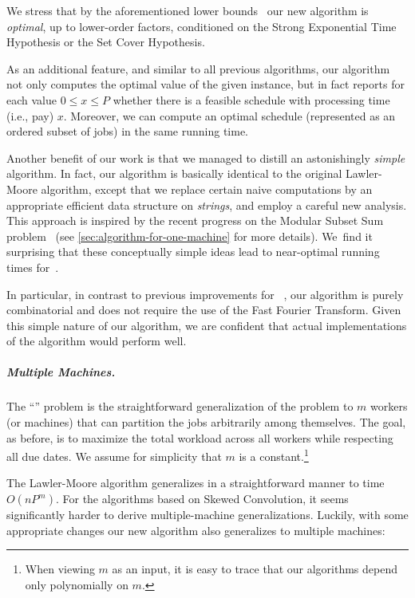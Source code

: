 \documentclass[10pt,a4paper]{article}
\newcommand\Order{O}
\newcommand\MTPT{\smash{$1||\sum p_j U_j$}}
\newcommand\mMTPT{\smash{$P_m||\sum p_j U_j$}}
\begin{document}
We stress that by the aforementioned lower bounds~\cite{AbboudBHS19,CyganDLMNOPSW16} our new algorithm is \emph{optimal}, up to lower-order factors, conditioned on the Strong Exponential Time Hypothesis or the Set Cover Hypothesis.

As an additional feature, and similar to all previous algorithms, our algorithm not only computes the optimal value of the given instance, but in fact reports for each value $0 \leq x \leq P$ whether there is a feasible schedule with processing time (i.e., pay) $x$. Moreover, we can compute an optimal schedule (represented as an ordered subset of jobs) in the same running time.

Another benefit of our work is that we managed to distill an astonishingly \emph{simple} algorithm. In fact, our algorithm is basically identical to the original Lawler-Moore algorithm, except that we replace certain naive computations by an appropriate efficient data structure on \emph{strings}, and employ a careful new analysis. This approach is inspired by the recent progress on the Modular Subset Sum problem~\cite{AxiotisBJTW19,AxiotisBBJNTW21,CardinalI21,Potepa21} (see \cref{sec:algorithm-for-one-machine} for more details). We~find it surprising that these conceptually simple ideas lead to near-optimal running times for~. 

In particular, in contrast to previous improvements for \MTPT{}~\cite{BringmannFHSW22,KleinPR23,SchieberS23}, our algorithm is purely combinatorial and does not require the use of the Fast Fourier Transform. Given this simple nature of our algorithm, we are confident that actual implementations of the algorithm would perform well.

\subparagraph{Multiple Machines.}
The ``\mMTPT{}'' problem is the straightforward generalization of the \MTPT{} problem to $m$ workers (or machines) that can partition the jobs arbitrarily among themselves. The goal, as before, is to maximize the total workload across all workers while respecting all due dates. We assume for simplicity that $m$ is a constant.\footnote{When viewing $m$ as an input, it is easy to trace that our algorithms depend only polynomially on $m$.}

The Lawler-Moore algorithm generalizes in a straightforward manner to time $\Order(n P^m)$. For the algorithms based on Skewed Convolution, it seems significantly harder to derive multiple-machine generalizations.
Luckily, with some appropriate changes our new algorithm also generalizes to multiple machines:
\end{document}

